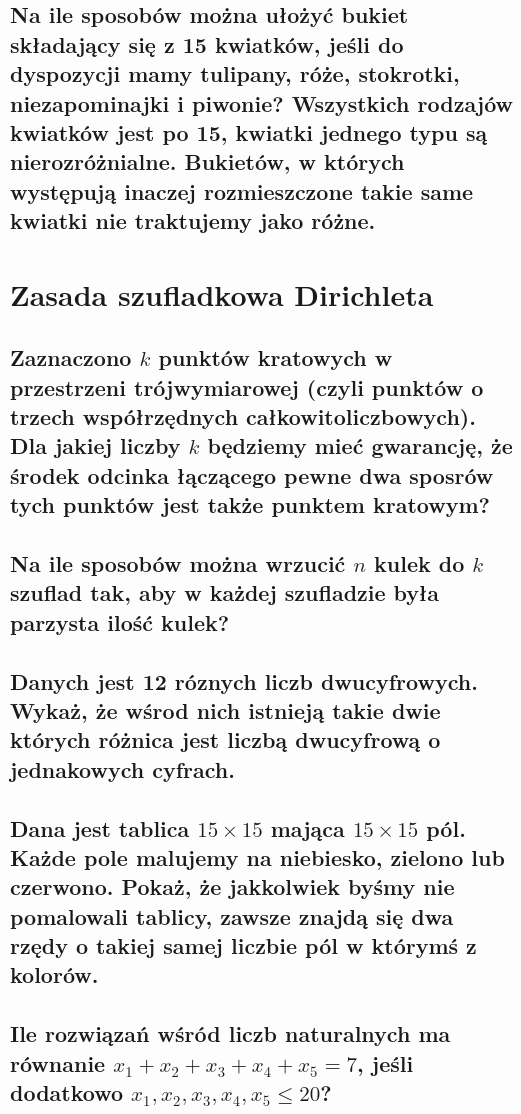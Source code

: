 \documentclass[12pt]{article}
\begin{document}
\subsection{Na ile sposobów można ułożyć bukiet składający się z 15 kwiatków, jeśli do dyspozycji mamy tulipany, róże, stokrotki, niezapominajki i piwonie? Wszystkich rodzajów kwiatków jest po 15, kwiatki jednego typu są nierozróżnialne. Bukietów, w których występują inaczej rozmieszczone takie same kwiatki nie traktujemy jako różne.}


\section{Zasada szufladkowa Dirichleta}

\subsection{Zaznaczono $k$ punktów kratowych w przestrzeni trójwymiarowej (czyli punktów o trzech współrzędnych całkowitoliczbowych). Dla jakiej liczby $k$ będziemy mieć gwarancję, że środek odcinka łączącego pewne dwa sposrów tych punktów jest także punktem kratowym?}


\subsection{Na ile sposobów można wrzucić $n$ kulek do $k$ szuflad tak, aby w każdej szufladzie była parzysta ilość kulek?}

\subsection{Danych jest 12 róznych liczb dwucyfrowych. Wykaż, że wśrod nich istnieją takie dwie których różnica jest liczbą dwucyfrową o jednakowych cyfrach.}

\subsection{Dana jest tablica $15\times 15$ mająca $15 \times 15$ pól. Każde pole malujemy na niebiesko, zielono lub czerwono. Pokaż, że jakkolwiek byśmy nie pomalowali tablicy, zawsze znajdą się dwa rzędy o takiej samej liczbie pól w którymś z kolorów.}

\subsection{Ile rozwiązań wśród liczb naturalnych ma równanie $x_1+x_2+x_3+x_4+x_5=7$, jeśli dodatkowo $x_1, x_2, x_3, x_4, x_5 \leq 20$?}
\end{document}

